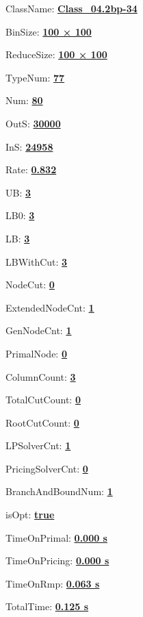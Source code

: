 \documentclass[11pt]{article}
\begin{document}
\pagestyle{empty}


ClassName: \underline{\textbf{Class_04.2bp-34}}
\par
BinSize: \underline{\textbf{100 × 100}}
\par
ReduceSize: \underline{\textbf{100 × 100}}
\par
TypeNum: \underline{\textbf{77}}
\par
Num: \underline{\textbf{80}}
\par
OutS: \underline{\textbf{30000}}
\par
InS: \underline{\textbf{24958}}
\par
Rate: \underline{\textbf{0.832}}
\par
UB: \underline{\textbf{3}}
\par
LB0: \underline{\textbf{3}}
\par
LB: \underline{\textbf{3}}
\par
LBWithCut: \underline{\textbf{3}}
\par
NodeCut: \underline{\textbf{0}}
\par
ExtendedNodeCnt: \underline{\textbf{1}}
\par
GenNodeCnt: \underline{\textbf{1}}
\par
PrimalNode: \underline{\textbf{0}}
\par
ColumnCount: \underline{\textbf{3}}
\par
TotalCutCount: \underline{\textbf{0}}
\par
RootCutCount: \underline{\textbf{0}}
\par
LPSolverCnt: \underline{\textbf{1}}
\par
PricingSolverCnt: \underline{\textbf{0}}
\par
BranchAndBoundNum: \underline{\textbf{1}}
\par
isOpt: \underline{\textbf{true}}
\par
TimeOnPrimal: \underline{\textbf{0.000 s}}
\par
TimeOnPricing: \underline{\textbf{0.000 s}}
\par
TimeOnRmp: \underline{\textbf{0.063 s}}
\par
TotalTime: \underline{\textbf{0.125 s}}
\par
\newpage
\end{document}
